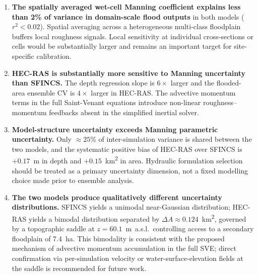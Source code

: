\documentclass[review,12pt]{elsarticle}
\newcommand{\sfincs}{\textsc{SFINCS}}
\newcommand{\hecras}{\textsc{HEC-RAS}}
\begin{document}
\begin{enumerate}

  \item \textbf{The spatially averaged wet-cell Manning coefficient
        explains less than 2\% of variance in domain-scale flood outputs}
        in both models ($r^2 < 0.02$).
        Spatial averaging across a heterogeneous multi-class floodplain buffers
        local roughness signals.
        Local sensitivity at individual cross-sections or cells would be
        substantially larger and remains an important target for
        site-specific calibration.

  \item \textbf{\hecras{} is substantially more sensitive to Manning
        uncertainty than \sfincs{}.}
        The depth regression slope is $6\times$ larger and the flooded-area
        ensemble CV is $4\times$ larger in \hecras{}.
        The advective momentum terms in the full Saint-Venant equations
        introduce non-linear roughness--momentum feedbacks absent in
        the simplified inertial solver.

  \item \textbf{Model-structure uncertainty exceeds Manning parametric
        uncertainty.}
        Only $\approx 25$\% of inter-simulation variance is shared between
        the two models, and the systematic positive bias of \hecras{}
        over \sfincs{} is $+0.17$~m in depth and $+0.15$~km\textsuperscript{2}
        in area.
        Hydraulic formulation selection should be treated as a primary
        uncertainty dimension, not a fixed modelling choice made prior to
        ensemble analysis.

  \item \textbf{The two models produce qualitatively different uncertainty
        distributions.}
        \sfincs{} yields a unimodal near-Gaussian distribution;
        \hecras{} yields a bimodal distribution separated by
        $\Delta A \approx 0.124$~km\textsuperscript{2}, governed by
        a topographic saddle at $z = 60.1$~m~a.s.l.\ controlling access
        to a secondary floodplain of 7.4~ha.
        This bimodality is consistent with the proposed mechanism of
        advective momentum accumulation in the full SVE; direct confirmation
        via per-simulation velocity or water-surface-elevation fields at the
        saddle is recommended for future work.


\end{enumerate}
\end{document}

